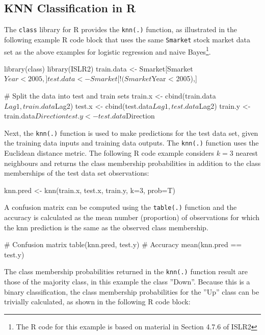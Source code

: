 \begin{withcode}
\subsection{KNN Classification in R}

The \texttt{class} library for R provides the \texttt{knn(.)} function, as illustrated in the following example R code block that uses the same \texttt{Smarket} stock market data set as the above examples for logistic regression and naive Bayes\footnote{The R code for this example is based on material in Section 4.7.6 of ISLR2}.

\begin{Rcode}
library(class)
library(ISLR2)
train.data <- Smarket[Smarket$Year < 2005,]
test.data <- Smarket[!(Smarket$Year < 2005),]

# Split the data into test and train sets
train.x <- cbind(train.data$Lag1, train.data$Lag2)
test.x <- cbind(test.data$Lag1, test.data$Lag2)
train.y <- train.data$Direction
test.y <- test.data$Direction
\end{Rcode}

Next, the \texttt{knn(.)} function is used to make predictions for the test data set, given the training data inputs and training data outputs. The \texttt{knn(.)} function uses the Euclidean distance metric. The following R code example considers $k=3$ nearest neighbours and returns the class membership probabilities in addition to the class memberships of the test data set observations:

\begin{Rcode}
knn.pred <- knn(train.x, test.x, train.y, k=3, prob=T)
\end{Rcode}

A confusion matrix can be computed using the \texttt{table(.)} function and the accuracy is calculated as the mean number (proportion) of observations for which the knn prediction is the same as the observed class membership.

\begin{Rcode}
# Confusion matrix
table(knn.pred, test.y)
# Accuracy
mean(knn.pred == test.y)
\end{Rcode}

The class membership probabilities returned in the \texttt{knn(.)} function result are those of the majority class, in this example the class ''Down''. Because this is a binary classification, the class membership probabilities for the ''Up'' class can be trivially calculated, as shown in the following R code block:


\end{withcode}
